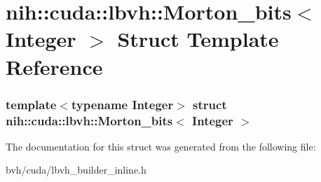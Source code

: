 \hypertarget{structnih_1_1cuda_1_1lbvh_1_1_morton__bits}{
\section{nih\-:\-:cuda\-:\-:lbvh\-:\-:\-Morton\-\_\-bits$<$ \-Integer $>$ \-Struct \-Template \-Reference}
\label{structnih_1_1cuda_1_1lbvh_1_1_morton__bits}
}
\subsubsection*{template$<$typename Integer$>$ struct nih\-::cuda\-::lbvh\-::\-Morton\-\_\-bits$<$ Integer $>$}



\-The documentation for this struct was generated from the following file\-:\begin{DoxyCompactItemize}
\item 
bvh/cuda/lbvh\-\_\-builder\-\_\-inline.\-h\end{DoxyCompactItemize}
